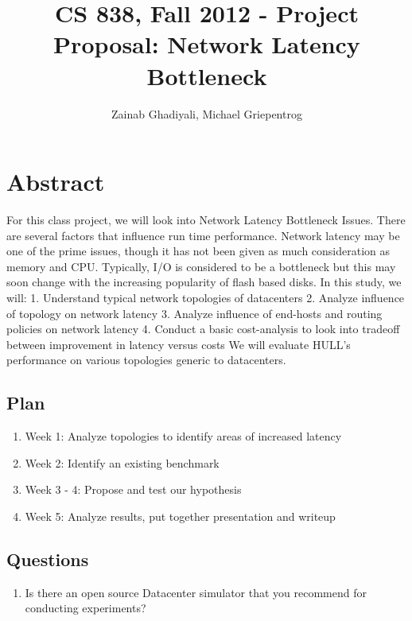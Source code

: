 \documentclass{article}
\begin{document}
\title{CS 838, Fall 2012 - Project Proposal: Network Latency Bottleneck}
\author{Zainab Ghadiyali, Michael Griepentrog}

\maketitle

\section{Abstract}
For this class project, we will look into Network Latency Bottleneck Issues.
There are several factors that influence run time performance. Network latency
may be one of the prime issues, though it has not been given as much
consideration as memory and CPU. Typically, I/O is considered to be a bottleneck
but this may soon change with the increasing popularity of flash based disks. In
this study, we will:
1. Understand typical network topologies of datacenters
2. Analyze influence of topology on network latency
3. Analyze influence of end-hosts and routing policies on network latency
4. Conduct a basic cost-analysis to look into tradeoff between improvement in
latency versus costs
We will evaluate HULL's performance on various topologies generic to
datacenters. 
\subsection{Plan}
\begin{enumerate}
\item Week 1: Analyze topologies to identify areas of increased latency
\item Week 2: Identify an existing benchmark
\item Week 3 - 4: Propose and test our hypothesis
\item Week 5: Analyze results, put together presentation and writeup
\end{enumerate}
\subsection{Questions}
\begin{enumerate}
\item Is there an open source Datacenter simulator that you recommend for
conducting experiments?
\end{enumerate}
\end{document}
